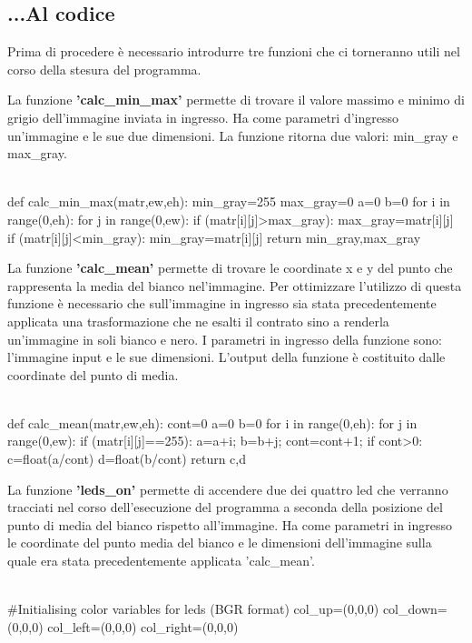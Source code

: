 \documentclass[12pt]{article}
\begin{document}
{\subsection{...Al codice}
\vspace{1cm} Prima di procedere \`e necessario introdurre tre funzioni che ci torneranno utili nel corso della stesura del programma. 

\vspace{1cm} La funzione \textbf{'calc\_min\_max'} permette di trovare il valore massimo e minimo di grigio dell'immagine inviata in ingresso. Ha come parametri d'ingresso un'immagine e le sue due dimensioni. La funzione ritorna due valori: min\_gray e max\_gray.
\\
\\


 \begin{codice}
 	def calc_min_max(matr,ew,eh):
 	min_gray=255
 	max_gray=0
 	a=0
 	b=0
 	for i in range(0,eh):
 	   for j in range(0,ew):
 	      if (matr[i][j]>max_gray):
 	         max_gray=matr[i][j]
 	      if (matr[i][j]<min_gray):
 	         min_gray=matr[i][j]
 	return min_gray,max_gray
 \end{codice}

\vspace{1cm} La funzione \textbf{'calc\_mean'} permette di trovare le coordinate x e y del punto che rappresenta la media del bianco nel'immagine. Per ottimizzare l'utilizzo di questa funzione \`e necessario che sull'immagine in ingresso sia stata precedentemente applicata una trasformazione che ne esalti il contrato sino a renderla un'immagine in soli bianco e nero. I parametri in ingresso della funzione sono: l'immagine input e le sue dimensioni. L'output della funzione è costituito dalle coordinate del punto di media.
\\
\\


\begin{codice}
def calc_mean(matr,ew,eh):
cont=0
a=0
b=0
for i in range(0,eh):
   for j in range(0,ew):
      if (matr[i][j]==255):
         a=a+i;
         b=b+j;
         cont=cont+1;
      if cont>0:
         c=float(a/cont)
         d=float(b/cont)
return c,d

\end{codice}

\vspace{1cm} La funzione \textbf{'leds\_on'} permette di accendere due dei quattro led che verranno tracciati nel corso dell'esecuzione del programma a seconda della posizione del punto di media del bianco rispetto all'immagine. Ha come parametri in ingresso le coordinate del punto media del bianco e le dimensioni dell'immagine sulla quale era stata precedentemente applicata 'calc\_mean'.
\\
\\
\begin{codice}
	#Initialising color variables for leds (BGR format)
	col_up=(0,0,0)
	col_down=(0,0,0)
	col_left=(0,0,0)
	col_right=(0,0,0)
	

\end{codice}}
\end{document}
